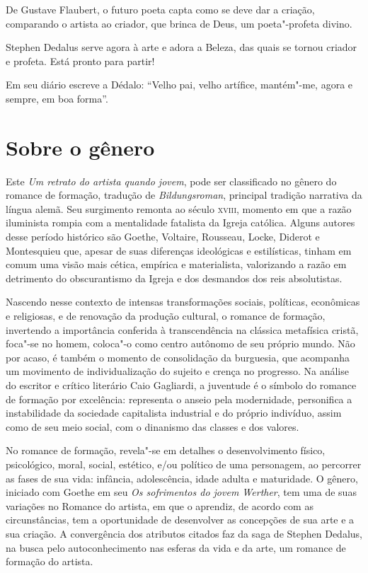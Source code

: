 De Gustave Flaubert, o futuro poeta capta como se deve dar a criação,
comparando o artista ao criador, que brinca de Deus, um poeta"-profeta
divino.

Stephen Dedalus serve agora à arte e adora a Beleza, das quais se tornou
criador e profeta. Está pronto para partir!

Em seu diário escreve a Dédalo:
``Velho pai, velho artífice, mantém"-me, agora e sempre, em boa forma''.


\section{Sobre o gênero}

Este \textit{Um retrato do artista
quando jovem}, pode ser classificado no gênero do romance de formação, tradução
de \textit{Bildungsroman}, principal tradição narrativa da língua alemã.
Seu surgimento remonta ao século \textsc{xviii}, momento em que a razão iluminista
rompia com a mentalidade fatalista da Igreja católica.
Alguns autores desse período histórico são Goethe, Voltaire, Rousseau, Locke, Diderot e Montesquieu que, apesar de suas diferenças ideológicas e estilísticas, tinham em comum
uma visão mais cética, empírica e materialista, valorizando a razão em detrimento do obscurantismo da Igreja e dos desmandos dos reis absolutistas.

Nascendo nesse contexto de intensas transformações sociais, políticas, econômicas e religiosas, e de renovação da produção cultural, o romance de formação, invertendo a importância conferida à transcendência na clássica metafísica cristã, foca"-se no homem, coloca"-o como centro autônomo de seu próprio mundo. Não por acaso, é também o momento de consolidação da burguesia, que acompanha um movimento de individualização do sujeito e crença no progresso. Na análise do escritor e crítico literário Caio Gagliardi, a juventude é o símbolo do romance de formação por excelência: representa o anseio pela modernidade, personifica a instabilidade da sociedade capitalista industrial e do próprio indivíduo, assim como de seu meio social, com o dinanismo das classes e dos valores.

No romance de formação, revela"-se em detalhes o desenvolvimento físico,
psicológico, moral, social, estético, e/ou político de uma personagem,
ao percorrer as fases de sua vida: infância, adolescência, idade adulta
e maturidade. O gênero, iniciado com Goethe em seu \textit{Os
sofrimentos do jovem Werther}, tem uma de suas variações no
Romance do artista, em que o aprendiz, de acordo com as circunstâncias,
tem a oportunidade de desenvolver as concepções de sua arte e a sua
criação. A convergência dos atributos citados faz da saga de Stephen
Dedalus, na busca pelo autoconhecimento nas esferas da vida e da arte,
um romance de formação do artista.


